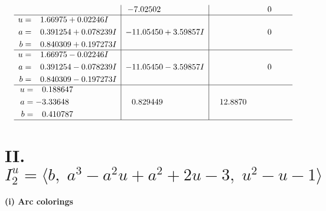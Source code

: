 \documentclass[1p]{elsarticle_modified}
\theoremstyle{definition}
\begin{document}
$$\begin{array}{c|c|c}
 & -7.02502\phantom{ +0.000000I} & \phantom{-0.000000 } 0 \\ \hline\begin{aligned}
u &= \phantom{-}1.66975 + 0.02246 I \\
a &= \phantom{-}0.391254 + 0.078239 I \\
b &= \phantom{-}0.840309 + 0.197273 I\end{aligned}
 & -11.05450 + 3.59857 I & \phantom{-0.000000 } 0 \\ \hline\begin{aligned}
u &= \phantom{-}1.66975 - 0.02246 I \\
a &= \phantom{-}0.391254 - 0.078239 I \\
b &= \phantom{-}0.840309 - 0.197273 I\end{aligned}
 & -11.05450 - 3.59857 I & \phantom{-0.000000 } 0 \\ \hline\begin{aligned}
u &= \phantom{-}0.188647\phantom{ +0.000000I} \\
a &= -3.33648\phantom{ +0.000000I} \\
b &= \phantom{-}0.410787\phantom{ +0.000000I}\end{aligned}
 & \phantom{-}0.829449\phantom{ +0.000000I} & \phantom{-}12.8870\phantom{ +0.000000I}\\
 \hline 
 \end{array}$$\newpage\newpage\renewcommand{\arraystretch}{1}
\centering \section*{II. $I^u_{2}= \langle b,\;a^3- a^2 u+a^2+2 u-3,\;u^2- u-1 \rangle$}
\flushleft \textbf{(i) Arc colorings}\\
\end{document}
